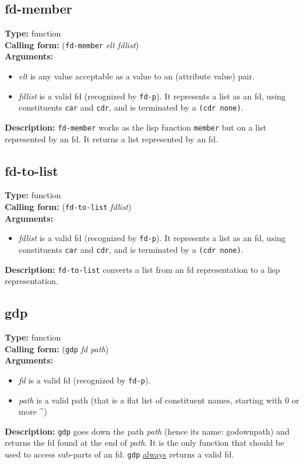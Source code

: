 \documentclass[10pt,a4paper]{report}
\begin{document}
\subsection{fd-member}
{\bf Type:} function
\\{\bf Calling form:} ({\tt fd-member} {\em elt fdlist})
\\{\bf Arguments:}
\begin{itemize}
\item {\em elt} is any value acceptable as a value to an (attribute
value) pair. 

\item {\em fdlist} is a valid fd (recognized by {\tt fd-p}). It represents a list as
an fd, using constituents {\tt car} and {\tt cdr}, and is terminated by a
{\tt (cdr none)}.
\end{itemize}
{\bf Description:} {\tt fd-member} works as the lisp function
{\tt member} but on a list represented by an fd. It returns a list
represented by an fd.


\subsection{fd-to-list}
{\bf Type:} function
\\{\bf Calling form:} ({\tt fd-to-list} {\em fdlist})
\\{\bf Arguments:}
\begin{itemize}
\item {\em fdlist} is a valid fd (recognized by {\tt fd-p}). It represents a list as
an fd, using constituents {\tt car} and {\tt cdr}, and is terminated by a
{\tt (cdr none)}.
\end{itemize}
{\bf Description:} {\tt fd-to-list} converts a list from an fd
representation to a lisp representation.


\subsection{gdp}
{\bf Type:} function
\\{\bf Calling form:} ({\tt gdp} {\em fd path})
\\{\bf Arguments:}
\begin{itemize}
\item {\em fd} is a valid fd (recognized by {\tt fd-p}).

\item {\em path} is a valid path (that is a flat list of constituent
names, starting with 0 or more \^{})
 
\end{itemize}
{\bf Description:} {\tt gdp} goes down the path {\em path} (hence its
name: godownpath) and returns the fd found at the end of
{\em path}. It is the only function that should be used to access
sub-parts of an fd. {\tt gdp} \underline{always} returns a valid fd.
\end{document}
